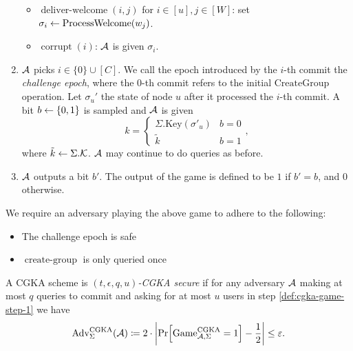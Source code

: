 \begin{definition}
\begin{enumerate}[1.]
\begin{itemize}
			      \item $\operatorname{deliver-welcome}(i, j)$ for $i \in [u], j \in [W]$: set $\sigma_i \leftarrow \operatorname{ProcessWelcome}(w_j)$.
			      \item $\operatorname{corrupt}(i)$: $\mathcal{A}$ is given $\sigma_i$.
		      \end{itemize}
		\item $\mathcal{A}$ picks $i \in \{0\} \cup [C]$.  We call the epoch introduced by the $i$-th commit the \emph{challenge epoch}, where the $0$-th commit refers to the initial $\mathrm{CreateGroup}$ operation. Let $\sigma_u'$ the state of node $u$ after it processed the $i$-th commit. A bit $b \leftarrow \{0, 1\}$ is sampled and $\mathcal{A}$ is given
		      \[
			      k = \begin{cases}
				      \Sigma.\mathrm{Key}(\sigma'_u) & b = 0 \\
				      \tilde{k}                      & b = 1
			      \end{cases},
		      \]
		      where $\tilde{k} \leftarrow \Sigma.\mathcal{K}$. $\mathcal{A}$ may continue to do queries as before.
		\item $\mathcal{A}$ outputs a bit $b'$. The output of the game is defined to be $1$ if $b' = b$, and $0$ otherwise.
	\end{enumerate}

	We require an adversary playing the above game to adhere to the following:
	\begin{itemize}
		\item The challenge epoch is safe 
		\item $\operatorname{create-group}$ is only queried once
	\end{itemize}
\end{definition}


\begin{definition}
	A CGKA scheme is \emph{$(t, \epsilon, q, u)$-CGKA secure} if for any adversary $\mathcal{A}$ making at most $q$ queries to $\mathrm{commit}$ and asking for at most $u$ users in step \ref{def:cgka-game-step-1} we have
	\begin{align*}
		\mathrm{Adv}_{\Sigma}^{\mathrm{CGKA}}(\adv) \coloneqq 2 \cdot \abs*{\pr{\mathrm{Game}_{\adv, \Sigma}^{\mathrm{CGKA}} = 1} - \frac{1}{2}} \le \epsilon.
	\end{align*}
\end{definition}

